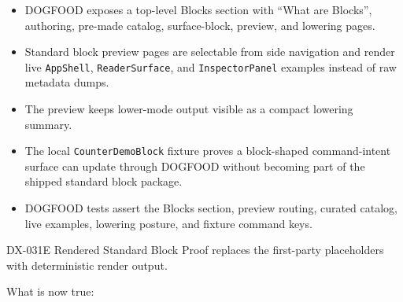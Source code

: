 \begin{itemize}
\tightlist
\item
  DOGFOOD exposes a top-level Blocks section with ``What are Blocks'', authoring, pre-made catalog, surface-block, preview, and lowering pages.
\item
  Standard block preview pages are selectable from side navigation and render live \texttt{A\allowbreak{}p\allowbreak{}p\allowbreak{}S\allowbreak{}h\allowbreak{}e\allowbreak{}l\allowbreak{}l}, \texttt{R\allowbreak{}e\allowbreak{}a\allowbreak{}d\allowbreak{}e\allowbreak{}r\allowbreak{}S\allowbreak{}u\allowbreak{}r\allowbreak{}f\allowbreak{}a\allowbreak{}c\allowbreak{}e}, and \texttt{I\allowbreak{}n\allowbreak{}s\allowbreak{}p\allowbreak{}e\allowbreak{}c\allowbreak{}t\allowbreak{}o\allowbreak{}r\allowbreak{}P\allowbreak{}a\allowbreak{}n\allowbreak{}e\allowbreak{}l} examples instead of raw metadata dumps.
\item
  The preview keeps lower-mode output visible as a compact lowering summary.
\item
  The local \texttt{C\allowbreak{}o\allowbreak{}u\allowbreak{}n\allowbreak{}t\allowbreak{}e\allowbreak{}r\allowbreak{}D\allowbreak{}e\allowbreak{}m\allowbreak{}o\allowbreak{}B\allowbreak{}l\allowbreak{}o\allowbreak{}c\allowbreak{}k} fixture proves a block-shaped command-intent surface can update through DOGFOOD without becoming part of the shipped standard block package.
\item
  DOGFOOD tests assert the Blocks section, preview routing, curated catalog, live examples, lowering posture, and fixture command keys.
\end{itemize}

DX-031E Rendered Standard Block Proof replaces the first-party placeholders with deterministic render output.

What is now true:

